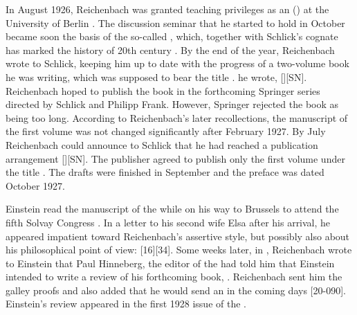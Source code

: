 \documentclass[draft]{article}
\newcommand{\PRZL}{\citetitle{Reichenbach1928}\xspace}
\newcommand{\Reich}{Reichenbach\xspace}
\begin{document}
In August 1926, Reichenbach was granted teaching privileges as an  () at the University of Berlin \citep{Hecht1982}. The discussion seminar that he started to hold in October became soon the basis of the so-called , which, together with Schlick's cognate  has marked the history of 20th century  . By the end of the year, Reichenbach wrote to Schlick, keeping him up to date with the progress of a two-volume book he was writing, which was supposed to bear the title .  he wrote,  [][SN]\label{RZL1926}. Reichenbach hoped to publish the book in the forthcoming Springer series  directed by Schlick and Philipp Frank. However, Springer rejected the book as being too long. According to \Reich's later recollections, the manuscript of the first volume was not changed significantly after February 1927. By July Reichenbach could announce to Schlick that he had reached a publication arrangement [][SN]. The publisher agreed to publish only the first volume under the title . The drafts were finished in September and the preface was dated October 1927.

Einstein read the manuscript of the \PRZL while on his way to Brussels to attend the fifth Solvay Congress  \citep{Bacciagaluppi2009}. In a letter to his second wife Elsa after his arrival, he appeared impatient toward Reichenbach's assertive style, but possibly also about his  philosophical point of view:  [16][34]. Some weeks later, in , Reichenbach wrote to Einstein that Paul Hinneberg, the editor of the  had told him that Einstein intended to write a review of his forthcoming book, . Reichenbach sent him the galley proofs and also added that he would send an \Ap in the coming days [20-090]. Einstein's review appeared in the first 1928 issue of the  \citep{Einstein1928d}. 
\end{document}
